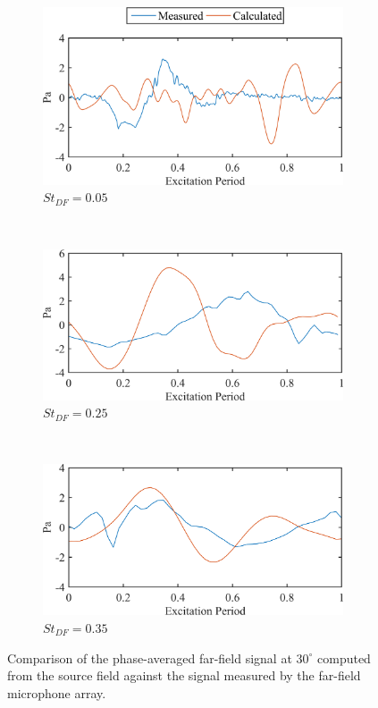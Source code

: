 \begin{figure}
	\centering
	\begin{subfigure}{1\textwidth}
		\centering
		\includegraphics[width=3.5in]{Figures/ch5_St005_FF_v2.png}
		\caption{$St_{DF} = 0.05$}
		\label{fig:ch5_farfield_imp}
	\end{subfigure}\\
	\begin{subfigure}{1\textwidth}
		\centering
		\includegraphics[width=3.5in]{Figures/ch5_St025_FF_v3.png}
		\caption{$St_{DF} = 0.25$}
	\end{subfigure}\\
	\begin{subfigure}{1\textwidth}
		\centering
		\includegraphics[width=3.5in]{Figures/ch5_St035_FF_v3.png}
		\caption{$St_{DF} = 0.35$}
	\end{subfigure}
	\caption{Comparison of the phase-averaged far-field signal at $30^\circ$ computed from the source field against the signal measured by the far-field microphone array.}
	\label{fig:ch5_farfield}
\end{figure}

